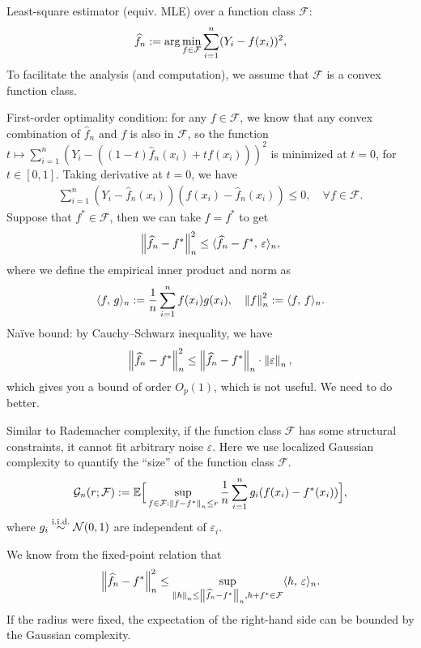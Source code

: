 \documentclass[11pt,letterpaper]{article}
\numberwithin{theorem}{lecture}
\numberwithin{proposition}{lecture}
\numberwithin{lemma}{lecture}
\numberwithin{claim}{lecture}
\numberwithin{corollary}{lecture}
\numberwithin{definition}{lecture}
\numberwithin{conjecture}{lecture}
\numberwithin{remark}{lecture}
\numberwithin{example}{lecture}
\numberwithin{equation}{lecture}
\begin{document}
Least-square estimator (equiv. MLE) over a function class $\mathcal{F}$:
\begin{align*}
  \widehat{f}_n := \arg\min_{f \in \mathcal{F}} \sum_{i = 1}^n (Y_i - f(x_i))^2,
\end{align*}
To facilitate the analysis (and computation), we assume that $\mathcal{F}$ is a convex function class.

First-order optimality condition: for any $f \in \mathcal{F}$, we know that any convex combination of $\widehat{f}_n$ and $f$ is also in $\mathcal{F}$, so the function $t \mapsto \sum_{i = 1}^n (Y_i - ((1 - t) \widehat{f}_n (x_i) + t f(x_i)))^2$ is minimized at $t = 0$, for $t \in [0, 1]$. Taking derivative at $t = 0$, we have
\begin{align*}
  \sum_{i = 1}^n (Y_i - \widehat{f}_n (x_i)) (f(x_i) - \widehat{f}_n (x_i)) \leq 0, \quad \forall f \in \mathcal{F}.
\end{align*}
Suppose that $f^* \in \mathcal{F}$, then we can take $f = f^*$ to get
\begin{align*}
  \left\| \widehat{f}_n - f^*\right\|_{n}^2 \leq \langle \widehat{f}_n - f^* , \, \varepsilon \rangle_n,
\end{align*}
where we define the empirical inner product and norm as
\begin{align*}
  \langle f , \, g \rangle_n := \frac{1}{n} \sum_{i = 1}^n f(x_i) g(x_i), \quad \left\| f\right\|_{n}^2 := \langle f , \, f \rangle_n.
\end{align*}
Na\"{i}ve bound: by Cauchy--Schwarz inequality, we have
\begin{align*}
  \left\| \widehat{f}_n - f^*\right\|_{n}^2 \leq \left\| \widehat{f}_n - f^*\right\|_{n} \cdot \left\| \varepsilon\right\|_{n},
\end{align*}
which gives you a bound of order $O_p (1)$, which is not useful. We need to do better.

Similar to Rademacher complexity, if the function class $\mathcal{F}$ has some structural constraints, it cannot fit arbitrary noise $\varepsilon$. Here we use localized Gaussian complexity to quantify the ``size'' of the function class $\mathcal{F}$.
\begin{align*}
  \mathcal{G}_n (r; \mathcal{F}) := {\mathbb{E}} \Big[ \sup_{f \in \mathcal{F}: \left\| f - f^*\right\|_{n} \leq r} \frac{1}{n} \sum_{i = 1}^n g_i (f(x_i) - f^* (x_i)) \Big],
\end{align*}
where $g_i \overset{\mathrm{i.i.d.}}{\sim} \mathcal{N} (0, 1)$ are independent of $\varepsilon_i$.

We know from the fixed-point relation that
\begin{align*}
  \left\| \widehat{f}_n - f^*\right\|_{n}^2  \leq \sup_{\left\| h\right\|_{n} \leq \left\| \widehat{f}_n - f^*\right\|_{n}, h + f^* \in \mathcal{F}} \langle h , \, \varepsilon \rangle_n.
\end{align*}
If the radius were fixed, the expectation of the right-hand side can be bounded by the Gaussian complexity.
\end{document}
